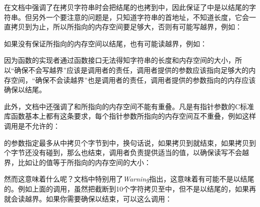 

在文档中强调了在拷贝字符串时会把结尾的也拷到中，因此保证了中是以结尾的字符串。但另外一个要注意的问题是，只知道字符串的首地址，不知道长度，它会一直拷贝到为止，所以所指向的内存空间要足够大，否则有可能写越界，例如：




如果没有保证所指向的内存空间以结尾，也有可能读越界，例如：




因为函数的实现者通过函数接口无法得知字符串的长度和内存空间的大小，所以“确保不会写越界”应该是调用者的责任，调用者提供的参数应该指向足够大的内存空间，“确保不会读越界”也是调用者的责任，调用者提供的参数指向的内存应该确保以结尾。



此外，文档中还强调了和所指向的内存空间不能有重叠。凡是有指针参数的C标准库函数基本上都有这条要求，每个指针参数所指向的内存空间互不重叠，例如这样调用是不允许的：




的参数指定最多从中拷贝个字节到中，换句话说，如果拷贝到就结束，如果拷贝到个字节还没有碰到，那么也结束，调用者负责提供适当的值，以确保读写不会越界，比如让的值等于所指向的内存空间的大小：




然而这意味着什么呢？文档中特别用了\emph{Warning}指出，这意味着有可能不是以结尾的。例如上面的调用，虽然把截断到10个字符拷贝至中，但不是以结尾的，如果再就会读越界。如果你需要确保以结束，可以这么调用：


